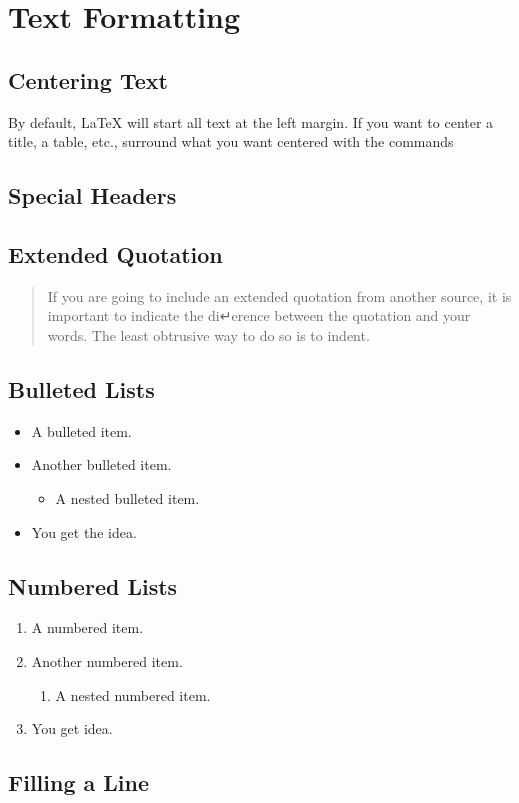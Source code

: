 \documentclass{article}
\begin{document}
\section{Text Formatting}
\subsection{Centering Text}

\begin{center}
By default, LaTeX will start all text at the left margin. If you want to center a title, a table, etc., surround what you want centered with the commands
\end{center}

\subsection{Special Headers}

\subsection{Extended Quotation}
\begin{quote}
If you are going to include an extended quotation from another source, it is important to indicate the di↵erence between the quotation and your words. The least obtrusive way to do so is to indent.
\end{quote}

\subsection{Bulleted Lists}
\begin{itemize}
\item A bulleted item.
\item Another bulleted item.
\begin{itemize}
\item A nested bulleted item.
\end{itemize}
\item You get the idea.
\end{itemize}

\subsection{Numbered Lists}
\begin{enumerate}
\item A numbered item.
\item Another numbered item.
\begin{enumerate}
\item A nested numbered item.
\end{enumerate}
\item You get idea.
\end{enumerate}

\subsection{Filling a Line}
\hspace{1cm}
\dotfill
\hrulefill
\end{document}
